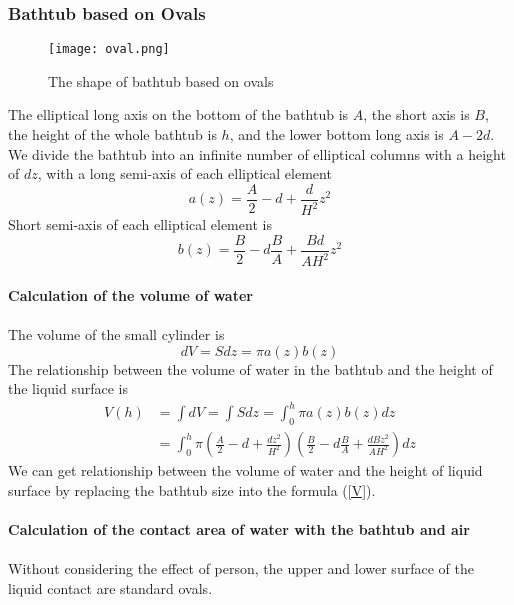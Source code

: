 \documentclass{mcmthesis}
\begin{document}
\subsubsection{Bathtub based on Ovals}
\begin{figure}[H]
\centerline{\texttt{[image: oval.png]}}
\caption{The shape of bathtub based on ovals}
\label{oval}	
\end{figure}
The elliptical long axis on the bottom of the bathtub is $A$, the short axis is $B$, the height of the whole bathtub is $h$, and the lower bottom long axis is $A-2d$.\\
\indent We divide the bathtub into an infinite number of elliptical columns with a height of $dz$, with a long semi-axis of each elliptical element\\
\begin{equation}
a(z)=\frac{A}{2}-d+\frac{d}{{H}^{2}}{z}^{2}
\end{equation}
\indent Short semi-axis of each elliptical element is
\begin{equation}
b(z)=\frac{B}{2}-d\frac{B}{A}+\frac{Bd}{A{H}^{2}}{z}^{2}
\end{equation}\\
\textbf{Calculation of the volume of water} \\\\
\indent The volume of the small cylinder is
\begin{equation}
dV=Sdz=\pi a(z)b(z)
\end{equation}
\indent The relationship between the volume of water in the bathtub and the height of the liquid surface is
\begin{equation}
\begin{split}
V(h)&=\int dV=\int Sdz=\int_{0}^{h}\pi a(z)b(z)dz \\
&=\int_{0}^{h}\pi(\frac{A}{2}-d+\frac{d{z}^{2}}{{H}^{2}})(\frac{B}{2}-d\frac{B}{A}+\frac{dB{z}^{2}}{A{H}^{2}})dz
\label{V}
\end{split}
\end{equation}
\indent We can get relationship between the volume of water and the height of liquid surface by replacing the bathtub size into the formula (\ref{V}).\\\\
\textbf{Calculation of the contact area of water with the bathtub and air} \\\\
\indent Without considering the effect of person, the upper and lower surface of the liquid contact are standard ovals.\\
\end{document}
